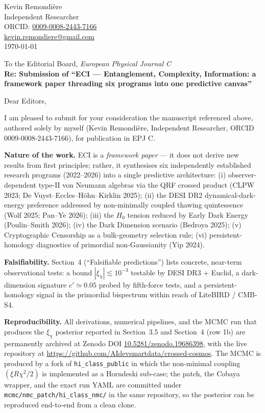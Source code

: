 \documentclass[11pt,a4paper]{article}
\begin{document}
\noindent Kevin Remondi\`ere \\
Independent Researcher \\
ORCID: \href{https://orcid.org/0009-0008-2443-7166}{0009-0008-2443-7166} \\
\href{mailto:kevin.remondiere@gmail.com}{kevin.remondiere@gmail.com} \\[1ex]
\today

\vspace{1em}
\noindent To the Editorial Board, \emph{European Physical Journal C} \\

\noindent \textbf{Re: Submission of ``ECI --- Entanglement, Complexity, Information: a framework paper threading six programs into one predictive canvas''}

\vspace{1em}

Dear Editors,

I am pleased to submit for your consideration the manuscript referenced above, authored solely by myself (Kevin Remondi\`ere, Independent Researcher, ORCID 0009-0008-2443-7166), for publication in EPJ C.

\textbf{Nature of the work.} ECI is a \emph{framework paper} --- it does not derive new results from first principles; rather, it synthesises six independently established research programs (2022--2026) into a single predictive architecture: (i) observer-dependent type-II von Neumann algebras via the QRF crossed product (CLPW 2023; De Vuyst--Eccles--H\"ohn--Kirklin 2025); (ii) the DESI DR2 dynamical-dark-energy preference addressed by non-minimally coupled thawing quintessence (Wolf 2025; Pan--Ye 2026); (iii) the $H_0$ tension reduced by Early Dark Energy (Poulin--Smith 2026); (iv) the Dark Dimension scenario (Bedroya 2025); (v) Cryptographic Censorship as a bulk-geometry selection rule; (vi) persistent-homology diagnostics of primordial non-Gaussianity (Yip 2024).

\textbf{Falsifiability.} Section~4 (``Falsifiable predictions'') lists concrete, near-term observational tests: a bound $|\xi_\chi| \lesssim 10^{-3}$ testable by DESI DR3 + Euclid, a dark-dimension signature $c' \simeq 0.05$ probed by fifth-force tests, and a persistent-homology signal in the primordial bispectrum within reach of LiteBIRD / CMB-S4.

\textbf{Reproducibility.} All derivations, numerical pipelines, and the MCMC run that produces the $\xi_\chi$ posterior reported in Section~3.5 and Section~4 (row 1b) are permanently archived at Zenodo DOI \href{https://doi.org/10.5281/zenodo.19686398}{10.5281/zenodo.19686398}, with the live repository at \url{https://github.com/AIdevsmartdata/crossed-cosmos}. The MCMC is produced by a fork of \texttt{hi\_class\_public} in which the non-minimal coupling $(\xi R \chi^{2}/2)$ is implemented as a Horndeski sub-case; the patch, the Cobaya wrapper, and the exact run YAML are committed under \texttt{mcmc/nmc\_patch/hi\_class\_nmc/} in the same repository, so the posterior can be reproduced end-to-end from a clean clone.
\end{document}
